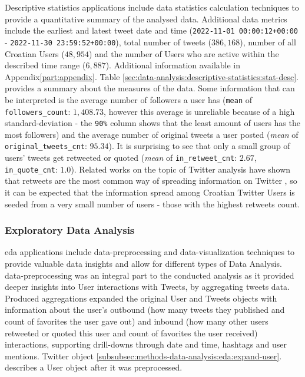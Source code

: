 Descriptive statistics applications include data statistics calculation techniques to provide a quantitative summary of the analysed data. Additional data metrics include the earliest and latest tweet date and time (\texttt{2022-11-01 00:00:12+00:00} - \texttt{2022-11-30 23:59:52+00:00}), total number of tweets (\(386,168\)), number of all Croatian Users (\(48,954\)) and the number of Users who are active within the described time range (\(6,887\)). Additional information available in Appendix\ref{part:appendix}. Table \ref{sec:data-analysis:descriptive-statistics:stat-desc}. provides a summary about the measures of the data. Some information that can be interpreted is the average number of followers a user has (\texttt{mean} of \texttt{followers\_count}: \(1,408.73\), however this average is unreliable because of a high \gls{standard-deviation} - the \texttt{90\%} column shows that the least amount of users has the most followers) and the average number of original tweets a user posted (\textit{mean} of \texttt{original\_tweets\_cnt}: \(95.34\)). It is surprising to see that only a small group of users' tweets get retweeted or quoted (\textit{mean} of \texttt{in\_retweet\_cnt}: \(2.67\), \texttt{in\_quote\_cnt}: \(1.0\)). Related works on the topic of Twitter analysis have shown that retweets are the most common way of spreading information on Twitter \cite{mestrovic2022retweetprediction}, so it can be expected that the information spread among Croatian Twitter Users is seeded from a very small number of users - those with the highest retweets count. 




\subsubsection{Exploratory Data Analysis}
\label{subsubsec:methods-data-analysis:eda}

\acrshort{eda} applications include \gls{data-preprocessing} and \gls{data-visualization} techniques to provide valuable data insights and allow for different types of Data Analysis. \Gls{data-preprocessing} was an integral part to the conducted analysis as it provided deeper insights into User interactions with Tweets, by aggregating tweets data. Produced aggregations expanded the original User and Tweets objects with information about the user's outbound (how many tweets they published and count of favorites the user gave out) and inbound (how many other users retweeted or quoted this user and count of favorites the user received) interactions, supporting drill-downs through date and time, hashtags and user mentions. Twitter object \ref{subsubsec:methods-data-analysis:eda:expand-user}. describes a User object after it was preprocessed. 

